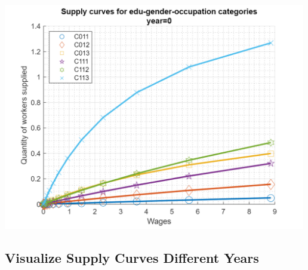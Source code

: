 \documentclass[
]{book}
\begin{document}
\includegraphics[width=5.20833in,height=\textheight]{img/bfwx_mlogit_images/figure_1.png}

\hypertarget{visualize-supply-curves-different-years}{%
\subsection{Visualize Supply Curves Different Years}\label{visualize-supply-curves-different-years}}
\end{document}

